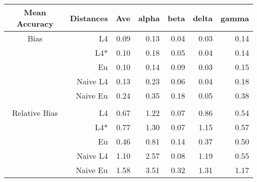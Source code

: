 \documentclass[a4paper,12pt,twoside]{book}
\begin{document}
\begin{table}[H]
\begin{tabular}{crrrrrr}
   
   \hline
{\color{blue}Mean Accuracy} & Distances & Ave & alpha & beta & delta & gamma \\ 
  \hline
{\color{blue}Bias} & L4  &0.09 & 0.13 & 0.04 & 0.03 & 0.14 \\ 
  
&L4*  & 0.10 & 0.18 & 0.05 & 0.04 & 0.14 \\ 
  
  
&Eu & 0.10 & 0.14 & 0.09 & 0.03 & 0.15 \\ 
  
  
&Naive L4&  
  0.13 & 0.23 & 0.06 & 0.04 & 0.18 \\
  
&Naive Eu &0.24 & 0.35 & 0.18 & 0.05 & 0.38 \\ 
  
  \\
   \hline
   
{\color{blue} Relative Bias } & L4  &0.67 & 1.22 & 0.07 & 0.86 & 0.54 \\ 
  
&L4*  &  0.77 & 1.30 & 0.07 & 1.15 & 0.57 \\ 
  
  
&Eu &  
   0.46 & 0.81 & 0.14 & 0.37 & 0.50 \\ 
 
&Naive L4&  
  
1.10 & 2.57 & 0.08 & 1.19 & 0.55 \\ 
 
  
  
&Naive Eu &  
  1.58 & 3.51 & 0.32 & 1.31 & 1.17 \\ 
  
   
  
\end{tabular}

\end{table}
\end{document}
